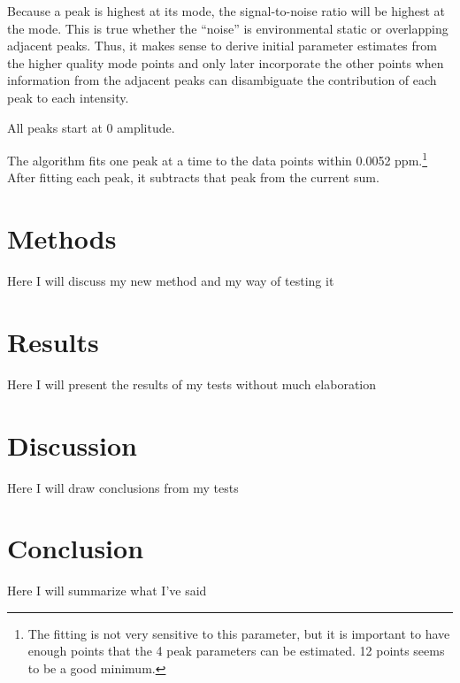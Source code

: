 \documentclass[10pt,letterpaper]{article}
\begin{document}
Because a peak is highest at its mode, the signal-to-noise ratio will be highest at the mode. This is true whether
the ``noise'' is environmental static or overlapping adjacent peaks. Thus, it makes sense to derive initial 
parameter estimates from the higher quality mode points and only later incorporate the other points when 
information from the adjacent peaks can disambiguate the contribution of each peak to each intensity.

All peaks start at 0 amplitude.

The algorithm fits one peak at a time to the data points within 0.0052 ppm.\footnote{The fitting is not very sensitive 
to this parameter, but it is important to have enough points that the 4 peak parameters can be estimated. 12 
points seems to be a good minimum.} After fitting each peak, it subtracts that peak from the current sum.


\section{Methods}
Here I will discuss my new method and my way of testing it
\section{Results}
Here I will present the results of my tests without much elaboration
\section{Discussion}
Here I will draw conclusions from my tests
\section{Conclusion}
Here I will summarize what I've said



\end{document}
